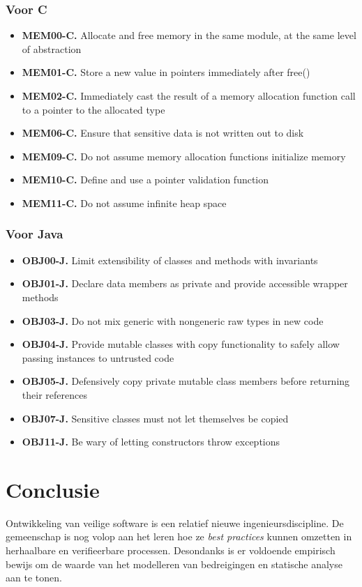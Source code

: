 \documentclass[../main.tex]{subfiles}
\begin{document}
\subsubsection{Voor C}
\begin{itemize}
	\item \textbf{MEM00-C.} Allocate and free memory in the same module, at the same level of abstraction
	\item \textbf{MEM01-C.} Store a new value in pointers immediately after free()
	\item \textbf{MEM02-C.} Immediately cast the result of a memory allocation function call to a pointer to the allocated type
	\item \textbf{MEM06-C.} Ensure that sensitive data is not written out to disk
	\item \textbf{MEM09-C.} Do not assume memory allocation functions initialize memory
	\item \textbf{MEM10-C.} Define and use a pointer validation function
	\item \textbf{MEM11-C.} Do not assume infinite heap space
\end{itemize}
\subsubsection{Voor Java}
\begin{itemize}
	\item \textbf{OBJ00-J.} Limit extensibility of classes and methods with invariants
	\item \textbf{OBJ01-J.} Declare data members as private and provide accessible wrapper methods
	\item \textbf{OBJ03-J.} Do not mix generic with nongeneric raw types in new code
	\item \textbf{OBJ04-J.} Provide mutable classes with copy functionality to safely allow passing instances to untrusted code
	\item \textbf{OBJ05-J.} Defensively copy private mutable class members before returning their references
	\item \textbf{OBJ07-J.} Sensitive classes must not let themselves be copied
	\item \textbf{OBJ11-J.} Be wary of letting constructors throw exceptions
\end{itemize}


\section{Conclusie}
Ontwikkeling van veilige software is een relatief nieuwe ingenieursdiscipline.  De gemeenschap is nog volop aan het leren hoe ze \textit{best practices} kunnen omzetten in herhaalbare en verifieerbare processen. Desondanks is er voldoende empirisch bewijs om de waarde van het modelleren van bedreigingen en statische analyse aan te tonen.
\end{document}
